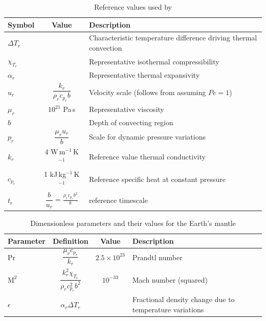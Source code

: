 \documentclass[document.tex]{subfiles}
\begin{document}
\begin{table}[ht]
    \centering
    \caption{Reference values used by \cite{scto01}}
    \label{schubert ref}
    \renewcommand{\arraystretch}{1.8}   %
    \setlength{\tabcolsep}{12pt}        %
    \begin{tabular}{lcl}
        \toprule
        Symbol & Value & Description \\
        \midrule
        $\Delta T_r$ & & Characteristic temperature difference driving thermal convection \\
        $\chi_{T_r}$ & & Representative isothermal compressibility \\
        $\alpha_r$ & & Representative thermal expansivity \\
        $u_r$ & $\dfrac{k_r}{\rho_r c_{p_r} b}$ & Velocity scale (follows from assuming $Pe = 1$) \\
        $\mu_r$ & $10^{21}$ Pa\,s & Representative viscosity \\
        $b$ & & Depth of convecting region \\
        $p_r$ & $\dfrac{\mu_r u_r}{b}$ & Scale for dynamic pressure variations \\
        $k_r$ & 4 W\,m$^{-1}$\,K$^{-1}$ & Reference value thermal conductivity \\
        $c_{p_r}$ & 1 kJ\,kg$^{-1}$\,K$^{-1}$ & Reference specific heat at constant pressure \\
        $t_r$ & $\dfrac{b}{u_r} = \frac{\rho_r c_{p_r} b^2}{k}$ & reference timescale \\ 
        \bottomrule
    \end{tabular}
\end{table}

\begin{table}[ht]
    \centering
    \caption{Dimensionless parameters and their values for the Earth's mantle}
    \label{dimensionless parameters schubert}
    \renewcommand{\arraystretch}{1.8}   %
    \setlength{\tabcolsep}{12pt}        %
    \begin{tabular}{lccl}
        \toprule
        Parameter & Definition & Value & Description \\
        \midrule
        $\mathrm{Pr}$ & $\dfrac{\mu_r c_{p_r}}{k_r}$ & $2.5 \times 10^{23}$ & Prandtl number \\
        $\mathrm{M}^2$ & $\dfrac{k_r^2 \chi_{T_r}}{\rho_r c_{p_r}^2 b^2}$ & $10^{-33}$ & Mach number (squared) \\
        $\epsilon$ & $\alpha_r \Delta T_r$ & & Fractional density change due to temperature variations \\
        \bottomrule
    \end{tabular}
\end{table}
\end{document}
